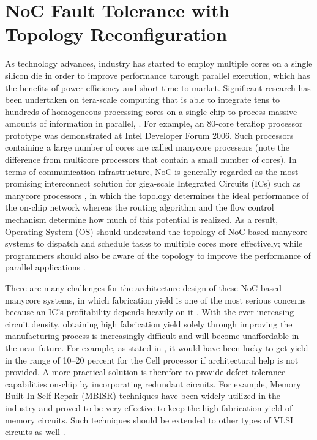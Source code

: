 \section{NoC Fault Tolerance with Topology Reconfiguration}
As technology advances, industry has started to employ multiple cores on a single silicon die in order to improve performance through parallel execution, which has the benefits of power-efficiency and short time-to-market\cite{geer2005chip}. Significant research has been undertaken on tera-scale computing that is able to integrate tens to hundreds of homogeneous processing cores on a single chip to process massive amounts of information in parallel\cite{thousandcore}, \cite{agarwal2007kill}. For example, an 80-core teraflop processor prototype was demonstrated at Intel Developer Forum 2006\cite{computingfew}. Such processors containing a large number of cores are called manycore processors (note the difference from multicore processors that contain a small number of cores). In terms of communication infrastructure, NoC is generally regarded as the most promising interconnect solution for giga-scale Integrated Circuits (ICs) such as manycore processors \cite{dally2001route,de2008networks}, in which the topology determines the ideal performance of the on-chip network whereas the routing algorithm and the flow control mechanism determine how much of this potential is realized. As a result, Operating System (OS) should understand the topology of NoC-based manycore systems to dispatch and schedule tasks to multiple cores more effectively; while programmers should also be aware of the topology to improve the performance of parallel applications \cite{Microsoft2007numa,stallings2012operating}.

There are many challenges for the architecture design of these NoC-based manycore systems, in which fabrication yield is one of the most serious concerns because an IC’s profitability depends heavily on it \cite{koren1998defect,koren2000should}. With the ever-increasing circuit density, obtaining high fabrication yield solely through improving the manufacturing process is increasingly difficult and will become unaffordable in the near future. For example, as stated in \cite{sperling2007turn}, it would have been lucky to get yield in the range of 10–20 percent for the Cell processor if architectural help is not provided. A more practical solution is therefore to provide defect tolerance capabilities on-chip by incorporating redundant circuits. For example, Memory Built-In-Self-Repair (MBISR) techniques have been widely utilized in the industry and proved to be very effective to keep the high fabrication yield of memory circuits. Such techniques should be extended to other types of VLSI circuits as well \cite{koren1986yield}.


